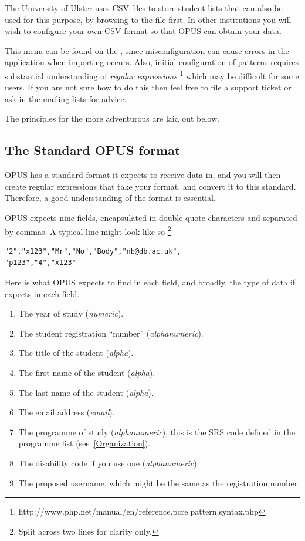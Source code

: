 \documentclass[12 pt]{book}
\begin{document}
The University of Ulster uses CSV files to store student lists that can also be used for this
purpose, by browsing to the file first. In other institutions you will wish to configure your
own CSV format so that OPUS can obtain your data.

This menu can be found on the ,
since misconfiguration can cause errors in the application when importing
occurs. Also, initial configuration of patterns requires substantial
understanding of \emph{regular expressions}%
\footnote{http://www.php.net/manual/en/reference.pcre.pattern.syntax.php}
which may be difficult for some users. If you are not sure how to do this then
feel free to file a support ticket or ask in the mailing lists for advice.

The principles for the more adventurous are laid out below.

\subsection{The Standard OPUS format}

OPUS has a standard format it expects to receive data in, and you will then
create regular expressions that take your format, and convert it to this
standard. Therefore, a good understanding of the format is essential.

OPUS expects nine fields, encapsulated in double quote characters and
separated by commas. A typical line might look like so%
\footnote{Split across two lines for clarity only.}

\begin{lstlisting}
"2","x123","Mr","No","Body","nb@db.ac.uk",
"p123","4","x123"
\end{lstlisting}

Here is what OPUS expects to find in each field, and broadly, the type of
data if expects in each field.

\begin{enumerate}
  \item The year of study (\emph{numeric}).
  \item The student registration ``number'' (\emph{alphanumeric}).
  \item The title of the student (\emph{alpha}).
  \item The first name of the student (\emph{alpha}).
  \item The last name of the student (\emph{alpha}).
  \item The email address (\emph{email}).
  \item The programme of study (\emph{alphanumeric}), this is the SRS code defined in the programme list (see~\ref{Organization}).
  \item The disability code if you use one (\emph{alphanumeric}).
  \item The proposed username, which might be the same as the registration number.
\end{enumerate}
\end{document}
